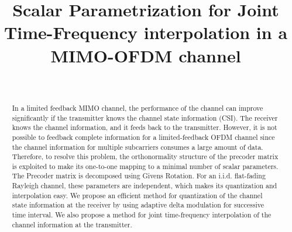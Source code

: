 \documentclass[conference]{IEEEtran}
\begin{document}
 


  

\title{Scalar Parametrization for Joint Time-Frequency interpolation in a MIMO-OFDM channel} 

  

  


  

\author{ 

\ 







} 

\maketitle 

  

\thispagestyle{plain} 


  

  

  



\begin{abstract} 

In a limited feedback MIMO channel, the performance of the channel can improve significantly if the transmitter knows the channel state information (CSI). The receiver knows the channel information, and it feeds back to the transmitter. However, it is not possible to feedback complete information for a limited-feedback OFDM channel since the channel information for multiple subcarriers consumes a large amount of data. Therefore, to resolve this problem, the orthonormality structure of the precoder matrix is exploited to make its one-to-one mapping to a minimal number of scalar parameters. The Precoder matrix is decomposed using Givens Rotation. For an i.i.d. flat-fading Rayleigh channel, these parameters are independent, which makes its quantization and interpolation easy. We propose an efficient method for quantization of the channel state information at the receiver by using adaptive delta modulation for successive time interval. We also propose a method for joint time-frequency interpolation of the channel information at the transmitter. 

\end{abstract} 
\end{document}
